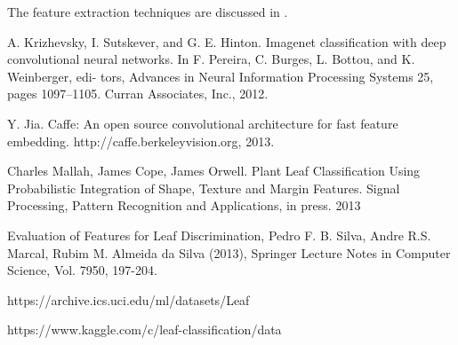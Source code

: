 \documentclass{article}
\begin{document}
The feature extraction techniques are discussed in \cite{Pedro13}.

\begin{thebibliography}{9}
     A. Krizhevsky, I. Sutskever, and G. E. Hinton. Imagenet classification with deep convolutional neural networks. In F. Pereira, C. Burges, L. Bottou, and K. Weinberger, edi- tors, Advances in Neural Information Processing Systems 25, pages 1097–1105. Curran Associates, Inc., 2012.

  Y. Jia. Caffe: An open source convolutional architecture for fast feature embedding. http://caffe.berkeleyvision.org, 2013.

Charles Mallah, James Cope, James Orwell. Plant Leaf Classification Using Probabilistic Integration of Shape, Texture and Margin Features. Signal Processing, Pattern Recognition and Applications, in press. 2013

Evaluation of Features for Leaf Discrimination, Pedro F. B. Silva, Andre R.S. Marcal, Rubim M. Almeida da Silva (2013), Springer Lecture Notes in Computer Science, Vol. 7950, 197-204.

https://archive.ics.uci.edu/ml/datasets/Leaf

https://www.kaggle.com/c/leaf-classification/data

\end{thebibliography}
\end{document}
